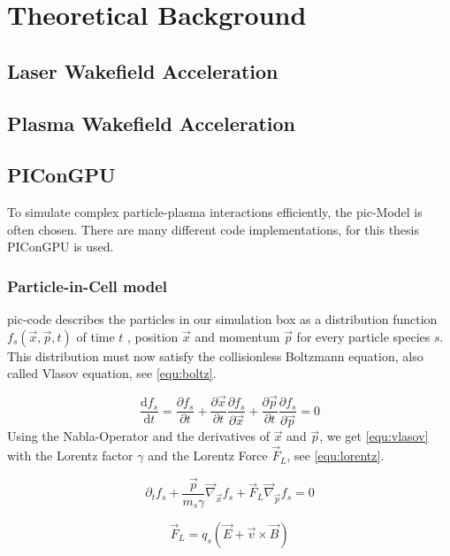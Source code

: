 \documentclass[bachelor_thesis]{subfiles}
\begin{document}
\chapter{Theoretical Background}
\section{Laser Wakefield Acceleration}
\section{Plasma Wakefield Acceleration}

\section{PIConGPU}
To simulate complex particle-plasma interactions efficiently, the \gls{pic}-Model is often chosen. There are many different code implementations, for this thesis PIConGPU \cite{PIConGPU2013, PICRepo} is used.

\subsection{Particle-in-Cell model} \label{chap:pic}
\Gls{pic}-code describes the particles in our simulation box as a distribution function $f_s(\vec{x}, \vec{p}, t)$ of time $t$ , position $\vec{x}$ and momentum $\vec{p}$ for every particle species $s$.
This distribution must now satisfy the collisionless Boltzmann equation, also called Vlasov equation\cite{Vlasov1968}, see \autoref{equ:boltz}.

\begin{equation}
	\frac{\mathrm{d}f_s}{\mathrm{d}t}=\frac{\partial f_s}{\partial t} + \frac{\partial \vec{x}}{\partial t} \frac{\partial f_s}{\partial \vec{x}} + \frac{\partial \vec{p}}{\partial t} \frac{\partial f_s}{\partial \vec{p}} = 0
	\label{equ:boltz}
\end{equation}
Using the Nabla-Operator and the derivatives of $\vec{x}$ and $\vec{p}$, we get \autoref{equ:vlasov} with the Lorentz factor $\gamma$ and the Lorentz Force $\vec{F}_L$, see \autoref{equ:lorentz}.

\begin{equation}
	\partial_t f_s + \frac{\vec{p}}{m_s \gamma} \vec{\nabla}_{\vec{x}} f_s + \vec{F}_L \vec{\nabla}_{\vec{p}} f_s = 0
	\label{equ:vlasov}
\end{equation}

\begin{equation}
	\vec{F}_L=q_s\left(\vec{E}+\vec{v}\times\vec{B}\right)
	\label{equ:lorentz}
\end{equation}
\end{document}
